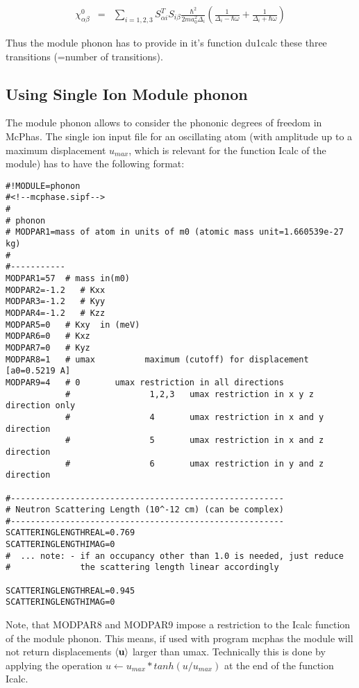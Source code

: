 \begin{eqnarray}
\chi^0_{\alpha\beta}
&=& \sum_{i=1,2,3} S^T_{\alpha i}S_{i\beta}\frac{\hbar^2}{2ma_0^2\Delta_i}
\left(\frac{1}{\Delta_i-\hbar\omega}+\frac{1}{\Delta_i+\hbar\omega}\right )
\end{eqnarray}

Thus the module {\prg phonon} has to provide in it's function {\prg du1calc} these three
transitions (=number of transitions).

\subsection{Using Single Ion Module {\prg phonon}}

The module {\prg phonon} allows to consider the phononic degrees of freedom in McPhas.
The single ion input file for an oscillating atom (with amplitude 
up to a maximum displacement $u_{max}$, which is relevant for the function {\prg Icalc} of the
module) has to have the following format:

\begin{verbatim}
#!MODULE=phonon
#<!--mcphase.sipf-->
#
# phonon
# MODPAR1=mass of atom in units of m0 (atomic mass unit=1.660539e-27 kg)
#
#-----------
MODPAR1=57  # mass in(m0)
MODPAR2=-1.2   # Kxx
MODPAR3=-1.2   # Kyy
MODPAR4=-1.2   # Kzz
MODPAR5=0   # Kxy  in (meV)
MODPAR6=0   # Kxz
MODPAR7=0   # Kyz
MODPAR8=1   # umax          maximum (cutoff) for displacement [a0=0.5219 A]
MODPAR9=4   # 0       umax restriction in all directions
            #                1,2,3   umax restriction in x y z direction only
            #                4       umax restriction in x and y direction
            #                5       umax restriction in x and z direction
            #                6       umax restriction in y and z direction

#-------------------------------------------------------
# Neutron Scattering Length (10^-12 cm) (can be complex)
#-------------------------------------------------------
SCATTERINGLENGTHREAL=0.769
SCATTERINGLENGTHIMAG=0
#  ... note: - if an occupancy other than 1.0 is needed, just reduce 
#              the scattering length linear accordingly

SCATTERINGLENGTHREAL=0.945
SCATTERINGLENGTHIMAG=0
\end{verbatim}

Note, that {\prg MODPAR8} and {\prg MODPAR9} impose a restriction to the {\prg Icalc} function
of the module {\prg phonon}. This means, if used with program {\prg mcphas} the
module will not return displacements $\langle \mathbf u \rangle$ larger than umax.
Technically this is done by applying the operation $u \leftarrow u_{max} * tanh (u/u_{max})$
at the end of the function {\prg Icalc}. 

